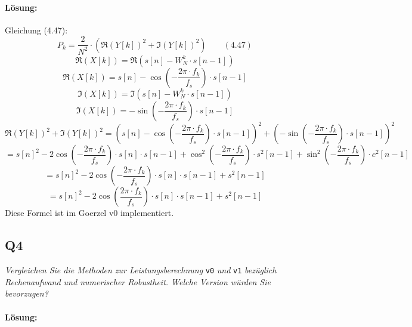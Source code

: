 \documentclass[a4,paper,fleqn]{article}
\begin{document}
\paragraph{Lösung: }
Gleichung (4.47):
\[
    P_k =
    \frac{2}{N^2} \cdot
    \left(
        \Re(Y[k])^2 + \Im(Y[k])^2
    \right)
    \qquad (4.47)
\]
\[
\Re(X[k]) = \Re(s[n] - W^k_N \cdot s[n-1])
\]
\[
\Re(X[k]) = s[n] - \cos\left(-\frac{2 \pi\cdot f_k}{f_s}\right)\cdot s[n-1]
\]
\[
\Im(X[k]) = \Im(s[n] - W^k_N \cdot s[n-1])
\]
\[
\Im(X[k]) = -\sin\left(-\frac{2 \pi\cdot f_k}{f_s}\right)\cdot s[n-1]
\]
\[
        \Re(Y[k])^2 + \Im(Y[k])^2 = \left(s[n] - \cos\left(-\frac{2 \pi\cdot f_k}{f_s}\right)\cdot s[n-1] \right)^2 + \left( -\sin\left(-\frac{2 \pi\cdot f_k}{f_s}\right)\cdot s[n-1]\right)^2
\]
\[
 = s[n]^2 - 2\cos\left(-\frac{2\pi \cdot f_k}{f_s}\right)\cdot s[n]\cdot s[n-1] + \cos^2\left(-\frac{2\pi\cdot f_k}{f_s}\right)\cdot s^2[n-1] + \sin^2\left(-\frac{2\pi\cdot f_k}{f_s}\right)\cdot c^2[n-1]
\]
\[
 = s[n]^2 - 2\cos\left(-\frac{2\pi \cdot f_k}{f_s}\right)\cdot s[n]\cdot s[n-1] + s^2[n-1]
\]
\[
 = s[n]^2 - 2\cos\left(\frac{2\pi \cdot f_k}{f_s}\right)\cdot s[n]\cdot s[n-1] + s^2[n-1]
\]
Diese Formel ist im Goerzel v0 implementiert.

\subsection{Q4}
\label{q4}
\emph{Vergleichen Sie die Methoden zur Leistungsberechnung}
\verb?v0?
\emph{und}
\verb?v1?
\emph{bezüglich Rechenaufwand und numerischer Robustheit. Welche Version 
würden Sie bevorzugen?}
\paragraph{Lösung: }
\end{document}
